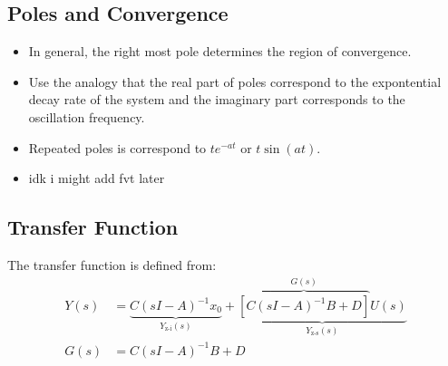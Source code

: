\documentclass[letterpaper,12pt]{article}
\begin{document}
\subsection{Poles and Convergence}
\begin{itemize}
    \item In general, the right most pole determines the region of convergence. 
    \item Use the analogy that the real part of poles correspond to the expontential decay rate of the system and the imaginary part corresponds to the oscillation frequency.
    \item Repeated poles is correspond to $t e^{-at}$ or $t \sin(at)$.
    \item idk i might add fvt later
\end{itemize}

\subsection{Transfer Function}
The transfer function is defined from:
\begin{align*}
    Y(s) &= \underbrace{C (sI - A)^{-1} x_0}_{Y_{\text{z-i}}(s)} + \underbrace{\overbrace{[C(sI - A)^{-1} B + D]}^{G(s)} U(s)}_{Y_{\text{z-s}}(s)} \\
    G(s) &= C(sI - A)^{-1}B + D
\end{align*}
\end{document}
